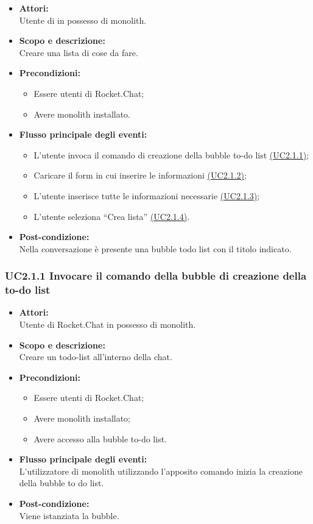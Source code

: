 \begin{itemize}
	\item \textbf{Attori:}
	\\Utente di  in possesso di monolith.
	\item \textbf{Scopo e descrizione:} 
	\\Creare una lista di cose da fare.
	\item \textbf{Precondizioni:}
	\begin{itemize}
		\item Essere utenti di Rocket.Chat;
		\item Avere monolith installato.
	\end{itemize}
	\item \textbf{Flusso principale degli eventi:}
	\begin{itemize}
		\item L’utente invoca il comando di creazione della bubble to-do list \hyperref[UC2.1.1]{(UC2.1.1)};
		\item Caricare il form in cui inserire le informazioni \hyperref[UC2.1.2]{(UC2.1.2)};
		\item L’utente inserisce tutte le informazioni necessarie \hyperref[UC2.1.3]{(UC2.1.3)};
		\item L’utente seleziona “Crea lista” \hyperref[UC2.1.4]{(UC2.1.4)}.
	\end{itemize}
	\item \textbf{Post-condizione:}
	\\Nella conversazione è presente una bubble todo list con il titolo indicato.
\end{itemize}

\subsubsection{UC2.1.1 Invocare il comando della bubble di creazione della to-do list} \label{UC2.1.1}

\begin{itemize}
	\item \textbf{Attori:}
	\\Utente di Rocket.Chat in possesso di monolith.
	\item \textbf{Scopo e descrizione:} 
	\\Creare un todo-list all'interno della chat.
	\item \textbf{Precondizioni:}
	\begin{itemize}
		\item Essere utenti di Rocket.Chat;
		\item Avere monolith installato;
		\item Avere accesso alla bubble to-do list.
	\end{itemize}
	\item \textbf{Flusso principale degli eventi:}
	\\L’utilizzatore di monolith utilizzando l'apposito comando inizia la creazione della bubble to do list.
	\item \textbf{Post-condizione:}
	\\Viene istanziata la bubble.
\end{itemize}

